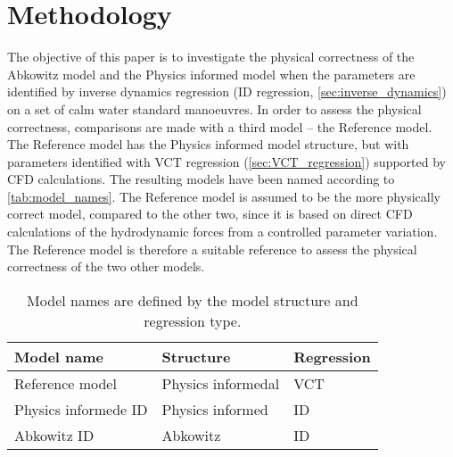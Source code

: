 \section{Methodology}
\label{sec:methodology}
The objective of this paper is to investigate the physical correctness of the Abkowitz model and the Physics informed model when the parameters are identified by inverse dynamics regression (ID regression, \autoref{sec:inverse_dynamics}) on a set of calm water standard manoeuvres. In order to assess the physical correctness, comparisons are made with a third model -- the Reference model. The Reference model has the Physics informed model structure, but with parameters identified with VCT regression (\autoref{sec:VCT_regression}) supported by CFD calculations. The resulting models have been named according to \autoref{tab:model_names}.
The Reference model is assumed to be the more physically correct model, compared to the other two, since it is based on direct CFD calculations of the hydrodynamic forces from a controlled parameter variation. The Reference model is therefore a suitable reference to assess the physical correctness of the two other models.
\begin{table}[h]
    \caption{Model names are defined by the model structure and regression type.}
    \label{tab:model_names}
    \centering
    \begin{tabular}{l l l}
        Model name                           & Structure      & Regression \\
        \hline
        Reference model & Physics informedal & VCT                         \\
        Physics informede ID  & Physics informed & ID         \\
        Abkowitz ID                          & Abkowitz       & ID         \\
    \end{tabular}
\end{table}

\FloatBarrier
